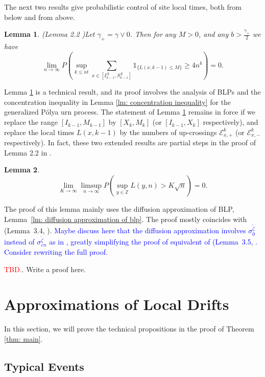 \documentclass[twoside,12pt,a4paper]{article}
\newtheorem{lemma}{Lemma}[section]
\numberwithin{equation}{section}
\newcommand\TBD{\textcolor{red}{TBD.}}
\newcommand{\comment}[1]{\textcolor{blue}{#1}}
\begin{document}
		
		The next two results give probabilistic control of site local times, both from below and from above.

		\begin{lemma}(Lemma 2.2 \cite{KMP22})\label{lm: number of rarely visit sites}
			Let $\gamma_+ = \gamma \vee 0$. Then for any $M>0$, and any $b>\frac{\gamma_+}{2}$ we have
			$$
			\lim_{n\to\infty} P\left(\sup_{k\leq nt}  \sum_{x\in [I^X_{k-1}, S^X_{k-1}]} \mathbb{1}_{\{ L(x,k-1) \leq M \}} \geq 4n^b \right) = 0.
			$$
			
		\end{lemma}	
		Lemma \ref{lm: number of rarely visit sites} is a technical result, and its proof involves the analysis of BLPs and the concentration inequality in Lemma \ref{lm: concentration inequality} for the generalized P\'{o}lya urn process. The statement of Lemma \ref{lm: number of rarely visit sites} remains in force if we replace the range $[I_{k-1}, M_{k-1}]$ by $[X_k,M_k]$ (or $[I_{k-1},X_k]$ respectively), and replace the local times $L(x,k-1)$ by the numbers of up-crossings $\mathcal{E}^{k}_{x,+}$ (or $\mathcal{E}^{k}_{x,-}$ respectively). In fact, these two extended results are partial steps in the proof of Lemma 2.2 in \cite{KMP22}.   

\begin{lemma}
	\label{lm: uniform control of local time}
	\[
		\lim_{K \to  \infty } \limsup_{n \to \infty } P\left( \sup_{y \in \mathbb{Z}} L\left( y, n \right) > K \sqrt{n}  \right) = 0
	.\] 
\end{lemma}
The proof of this lemma mainly uses the diffusion approximation of BLP, Lemma~\ref{lm: diffusion approximation of blp}. The proof mostly coincides with (Lemma~3.4, \cite{KP16}). 
\comment{Maybe discuss here that the diffusion approximation involves $\sigma_0^{\tilde \zeta}$ instead of $\sigma_{\varepsilon n}^{\tilde \zeta}$ as in \cite{KP16}, greatly simplifying the proof of equivalent of (Lemma~3.5, \cite{KP16}. Consider rewriting the full proof.
}

\TBD. Write a proof here.
		
		
		\section{Approximations of Local Drifts}\label{sec: approximations}
		In this section, we will prove the technical propositions in the proof of Theorem \ref{thm: main}.

		\subsection{Typical Events}
		
\end{document}
